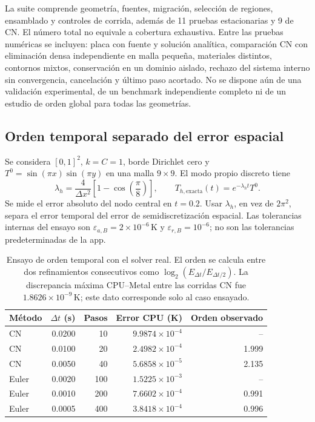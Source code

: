 \documentclass[11pt,a4paper]{article}
\newcommand{\dt}{\Delta t}
\begin{document}
La suite comprende geometría, fuentes, migración, selección de regiones,
ensamblado y controles de corrida, además de 11 pruebas estacionarias y 9 de
CN. El número total no equivale a cobertura exhaustiva. Entre las pruebas
numéricas se incluyen: placa con fuente y solución analítica, comparación
CN con eliminación densa independiente en malla pequeña, materiales distintos,
contornos mixtos, conservación en un dominio aislado, rechazo del sistema
interno sin convergencia, cancelación y último paso acortado. No se dispone
aún de una validación experimental, de un benchmark independiente completo
ni de un estudio de orden global para todas las geometrías.

\subsection{Orden temporal separado del error espacial}
Se considera $[0,1]^2$, $k=C=1$, borde Dirichlet cero y
$T^0=\sin(\pi x)\sin(\pi y)$ en una malla $9\times9$. El modo propio discreto
tiene
\begin{equation}
 \lambda_h=\frac{4}{\Delta x^2}\left[1-\cos\left(\frac{\pi}{8}\right)\right],
 \qquad T_{h,\mathrm{exacta}}(t)=e^{-\lambda_h t}T^0.
\end{equation}
Se mide el error absoluto del nodo central en $t=0.2$. Usar
$\lambda_h$, en vez de $2\pi^2$, separa el error temporal del error de
semidiscretización espacial. Las tolerancias internas del ensayo son
$\varepsilon_{a,B}=2\times10^{-6}\,\mathrm K$ y
$\varepsilon_{r,B}=10^{-6}$; no son las tolerancias predeterminadas de la app.

\begin{table}[htbp]\centering\small
\begin{tabular}{@{}lrrrr@{}}\toprule
Método & $\dt$ (s) & Pasos & Error CPU (K) & Orden observado\\\midrule
CN & 0.0200 & 10 & $9.9874\times10^{-4}$ & -- \\
CN & 0.0100 & 20 & $2.4982\times10^{-4}$ & 1.999 \\
CN & 0.0050 & 40 & $5.6858\times10^{-5}$ & 2.135 \\
\addlinespace
Euler & 0.0020 & 100 & $1.5225\times10^{-3}$ & -- \\
Euler & 0.0010 & 200 & $7.6602\times10^{-4}$ & 0.991 \\
Euler & 0.0005 & 400 & $3.8418\times10^{-4}$ & 0.996 \\
\bottomrule\end{tabular}
\caption{Ensayo de orden temporal con el solver real. El orden se calcula
entre dos refinamientos consecutivos como $\log_2(E_{\dt}/E_{\dt/2})$.
La discrepancia máxima CPU--Metal entre las corridas CN fue
$1.8626\times10^{-9}\,\mathrm K$; este dato corresponde solo al caso ensayado.}
\label{tab:temporal}
\end{table}
\end{document}
